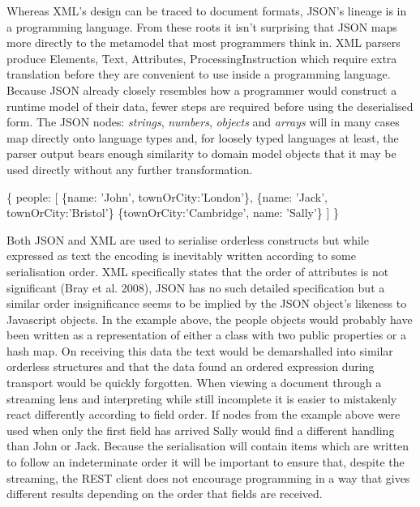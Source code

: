 \documentclass[12pt, ]{article}
\newenvironment{Shaded}{}{}
\newcommand{\DataTypeTok}[1]{\textcolor[rgb]{0.56,0.13,0.00}{{#1}}}
\newcommand{\StringTok}[1]{\textcolor[rgb]{0.25,0.44,0.63}{{#1}}}
\newcommand{\NormalTok}[1]{{#1}}
\begin{document}
Whereas XML's design can be traced to document formats, JSON's lineage
is in a programming language. From these roots it isn't surprising that
JSON maps more directly to the metamodel that most programmers think in.
XML parsers produce Elements, Text, Attributes, ProcessingInstruction
which require extra translation before they are convenient to use inside
a programming language. Because JSON already closely resembles how a
programmer would construct a runtime model of their data, fewer steps
are required before using the deserialised form. The JSON nodes:
\emph{strings}, \emph{numbers}, \emph{objects} and \emph{arrays} will in
many cases map directly onto language types and, for loosely typed
languages at least, the parser output bears enough similarity to domain
model objects that it may be used directly without any further
transformation.

\begin{Shaded}
\begin{Highlighting}[]
\NormalTok{\{}
   \DataTypeTok{people}\NormalTok{: [}
      \NormalTok{\{}\DataTypeTok{name}\NormalTok{: }\StringTok{'John'}\NormalTok{, }\DataTypeTok{townOrCity}\NormalTok{:}\StringTok{'London'}\NormalTok{\},}
      \NormalTok{\{}\DataTypeTok{name}\NormalTok{: }\StringTok{'Jack'}\NormalTok{, }\DataTypeTok{townOrCity}\NormalTok{:}\StringTok{'Bristol'}\NormalTok{\}}
      \NormalTok{\{}\DataTypeTok{townOrCity}\NormalTok{:}\StringTok{'Cambridge'}\NormalTok{, }\DataTypeTok{name}\NormalTok{: }\StringTok{'Sally'}\NormalTok{\}}
   \NormalTok{]}
\NormalTok{\}}
\end{Highlighting}
\end{Shaded}

Both JSON and XML are used to serialise orderless constructs but while
expressed as text the encoding is inevitably written according to some
serialisation order. XML specifically states that the order of
attributes is not significant (Bray et al. 2008), JSON has no such
detailed specification but a similar order insignificance seems to be
implied by the JSON object's likeness to Javascript objects. In the
example above, the people objects would probably have been written as a
representation of either a class with two public properties or a hash
map. On receiving this data the text would be demarshalled into similar
orderless structures and that the data found an ordered expression
during transport would be quickly forgotten. When viewing a document
through a streaming lens and interpreting while still incomplete it is
easier to mistakenly react differently according to field order. If
nodes from the example above were used when only the first field has
arrived Sally would find a different handling than John or Jack. Because
the serialisation will contain items which are written to follow an
indeterminate order it will be important to ensure that, despite the
streaming, the REST client does not encourage programming in a way that
gives different results depending on the order that fields are received.
\end{document}
